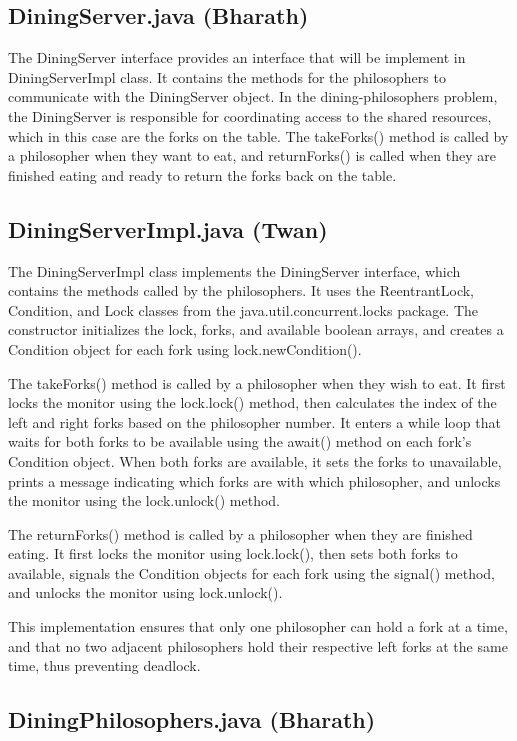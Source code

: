\documentclass{article}
\begin{document}
\subsection{DiningServer.java (Bharath)}

The DiningServer interface provides an interface that will be implement in DiningServerImpl class. It contains the methods for the philosophers to communicate with the DiningServer object. In the dining-philosophers problem, the DiningServer is responsible for coordinating access to the shared resources, which in this case are the forks on the table. The takeForks() method is called by a philosopher when they want to eat, and returnForks() is called when they are finished eating and ready to return the forks back on the table.

\subsection{DiningServerImpl.java (Twan)}

The DiningServerImpl class implements the DiningServer interface, which contains the methods called by the philosophers. It uses the ReentrantLock, Condition, and Lock classes from the java.util.concurrent.locks package. The constructor initializes the lock, forks, and available boolean arrays, and creates a Condition object for each fork using lock.newCondition().

The takeForks() method is called by a philosopher when they wish to eat. It first locks the monitor using the lock.lock() method, then calculates the index of the left and right forks based on the philosopher number. It enters a while loop that waits for both forks to be available using the await() method on each fork's Condition object. When both forks are available, it sets the forks to unavailable, prints a message indicating which forks are with which philosopher, and unlocks the monitor using the lock.unlock() method.

The returnForks() method is called by a philosopher when they are finished eating. It first locks the monitor using lock.lock(), then sets both forks to available, signals the Condition objects for each fork using the signal() method, and unlocks the monitor using lock.unlock().

This implementation ensures that only one philosopher can hold a fork at a time, and that no two adjacent philosophers hold their respective left forks at the same time, thus preventing deadlock.
\subsection{DiningPhilosophers.java (Bharath)}
\end{document}
